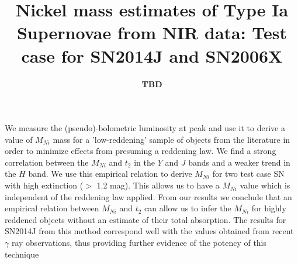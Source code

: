 \documentclass{aa}
\begin{document}
%
\title{Nickel mass estimates of Type Ia Supernovae from NIR data: Test case for SN2014J and SN2006X
}


\author{\textbf{TBD}}%



%
%
{We measure the  (pseudo)-bolometric luminosity at peak and use it to derive a value of $M_{Ni}$ mass for a 'low-reddening' sample of objects from the literature in order to minimize effects from presuming a reddening law. }
{We find a strong correlation between the $M_{Ni}$ and $t_2$ in the $Y$ and $J$ bands and a weaker trend in the $H$ band. We use this empirical relation to derive $M_{Ni}$ for two test case SN with high extinction ($>$  1.2 mag). This allows us to have a $M_{Ni}$ value which is independent of the reddening law applied.}
{From our results we conclude that an empirical relation between $M_{Ni}$ and $t_2$ can allow us to infer the $M_{Ni}$ for highly reddened objects without an estimate of their total absorption. The results for SN2014J from this method correspond well with the values obtained from recent $\gamma$ ray observations, thus providing further evidence of the potency of this technique}


\maketitle
\end{document}
